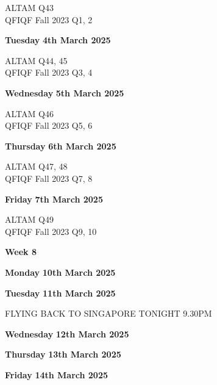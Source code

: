 \documentclass[hidelinks, 12pt]{article}
\theoremstyle{mydefstyle}
\theoremstyle{mythmstyle}
\begin{document}
ALTAM Q43 \\
QFIQF Fall 2023 Q1, 2

\textbf{Tuesday} \hfill \textbf{4th March 2025}

ALTAM Q44, 45 \\
QFIQF Fall 2023 Q3, 4

\textbf{Wednesday} \hfill \textbf{5th March 2025}

ALTAM Q46 \\
QFIQF Fall 2023 Q5, 6

\textbf{Thursday} \hfill \textbf{6th March 2025}

ALTAM Q47, 48 \\
QFIQF Fall 2023 Q7, 8

\textbf{Friday} \hfill \textbf{7th March 2025}

ALTAM Q49 \\
QFIQF Fall 2023 Q9, 10

\begin{center}
\textbf{Week 8}
\end{center}

\textbf{Monday} \hfill \textbf{10th March 2025}

\textbf{Tuesday} \hfill \textbf{11th March 2025}

FLYING BACK TO SINGAPORE TONIGHT 9.30PM

\textbf{Wednesday} \hfill \textbf{12th March 2025}

\textbf{Thursday} \hfill \textbf{13th March 2025}

\textbf{Friday} \hfill \textbf{14th March 2025}
\end{document}
